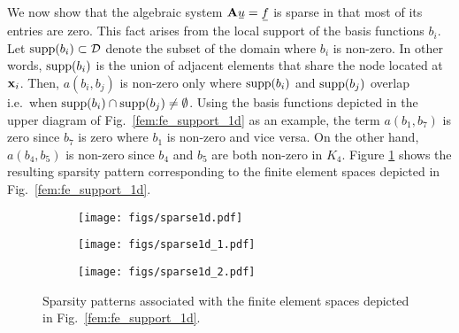 \documentclass[../doc.tex]{subfiles}
\begin{document}
We now show that the algebraic system $\mat{A}\ubar{u} = \ubar{f}$ is sparse in that most of its entries are zero. This fact arises from the local support of the basis functions $b_i$. Let $\operatorname{supp}(b_i) \subset \mathcal{D}$ denote the subset of the domain where $b_i$ is non-zero. In other words, $\operatorname{supp}(b_i)$ is the union of adjacent elements that share the node located at $\boldsymbol{\mathrm{x}}_i$. Then, $a(b_i, b_j)$ is non-zero only where $\operatorname{supp}(b_i)$ and $\operatorname{supp}(b_j)$ overlap i.e.~when $\operatorname{supp}(b_i) \cap \operatorname{supp}(b_j) \neq \emptyset$. Using the basis functions depicted in the upper diagram of Fig.~\ref{fem:fe_support_1d} as an example, the term $a(b_1,b_7)$ is zero since $b_7$ is zero where $b_1$ is non-zero and vice versa. On the other hand, $a(b_4,b_5)$ is non-zero since $b_4$ and $b_5$ are both non-zero in $K_4$. Figure \ref{fem:sparse1d} shows the resulting sparsity pattern corresponding to the finite element spaces depicted in Fig.~\ref{fem:fe_support_1d}. 
\begin{figure}
\centering
\begin{subfigure}{.32\textwidth}
	\centering
	\texttt{[image: figs/sparse1d.pdf]}
	\caption{}
\end{subfigure}
\begin{subfigure}{.32\textwidth}
	\centering
	\texttt{[image: figs/sparse1d\_1.pdf]}
	\caption{}
\end{subfigure}
\begin{subfigure}{.32\textwidth}
	\centering
	\texttt{[image: figs/sparse1d\_2.pdf]}
	\caption{}
\end{subfigure}
\caption{Sparsity patterns associated with the finite element spaces depicted in Fig.~\ref{fem:fe_support_1d}. }
\label{fem:sparse1d}
\end{figure}
\end{document}
